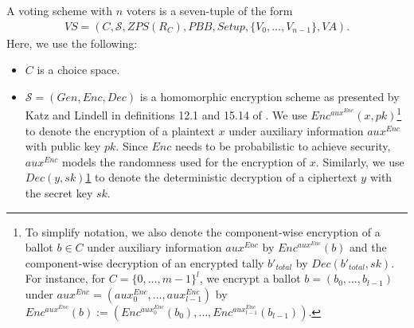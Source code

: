 \newpage
\begin{definition}
  \label{def:votingScheme}
  A voting scheme with $n$ voters is a seven-tuple of the form 
  \begin{align*}
    VS=(C, \mathcal{S}, ZPS(R_C), PBB, Setup, \{V_0, \dots, V_{n-1}\}, VA)\text{.}
  \end{align*}
  Here, we use the following:
  \begin{itemize}
    \item $C$ is a choice space.
    \item $\mathcal{S}=(Gen, Enc, Dec)$ is a homomorphic encryption scheme as presented by Katz and Lindell in definitions 12.1 and 15.14 of \cite{katz_introduction_2021}.
    We use $Enc^{aux^{Enc}}(x, pk)$\footnote{\label{footnote:compwiseEncDec}
      To simplify notation, we also denote the component-wise encryption of a ballot $b\in C$ under auxiliary information $aux^{Enc}$ by $Enc^{aux^{Enc}}(b)$ and the component-wise decryption of an encrypted tally $b'_{total}$ by $Dec(b'_{total}, sk)$.
      For instance, for $C=\{0,\dots, m-1\}^l$, we encrypt a ballot $b=(b_0,\dots, b_{l-1})$ under $aux^{Enc}=(aux^{Enc}_0,\dots, aux^{Enc}_{l-1})$ by $Enc^{aux^{Enc}}(b):=(Enc^{aux^{Enc}_0}(b_0),\dots, Enc^{aux^{Enc}_{l-1}}(b_{l-1}))$.
    } to denote the encryption of a plaintext $x$ under auxiliary information $aux^{Enc}$ with public key $pk$. 
    Since $Enc$ needs to be probabilistic to achieve security, $aux^{Enc}$ models the randomness used for the encryption of $x$.
    Similarly, we use $Dec(y, sk)$\cref{footnote:compwiseEncDec} to denote the deterministic decryption of a ciphertext $y$ with the secret key $sk$.
    

\end{itemize}
\end{definition}
